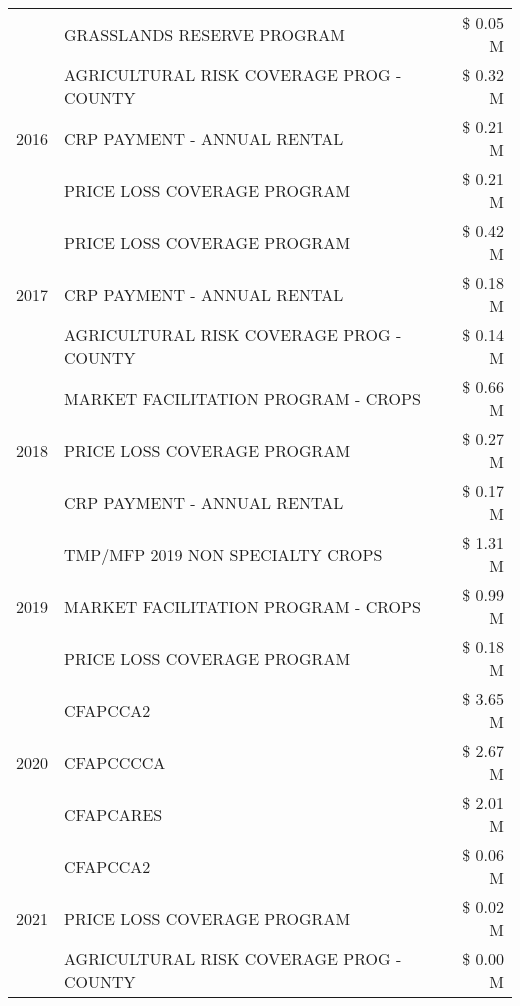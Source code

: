 \begin{tabular}{llr}
 & GRASSLANDS RESERVE PROGRAM & \$ 0.05 M \\
\cline{1-3}
\multirow[t]{3}{*}{2016} & AGRICULTURAL RISK COVERAGE PROG - COUNTY & \$ 0.32 M \\
 & CRP PAYMENT - ANNUAL RENTAL & \$ 0.21 M \\
 & PRICE LOSS COVERAGE PROGRAM & \$ 0.21 M \\
\cline{1-3}
\multirow[t]{3}{*}{2017} & PRICE LOSS COVERAGE PROGRAM & \$ 0.42 M \\
 & CRP PAYMENT - ANNUAL RENTAL & \$ 0.18 M \\
 & AGRICULTURAL RISK COVERAGE PROG - COUNTY & \$ 0.14 M \\
\cline{1-3}
\multirow[t]{3}{*}{2018} & MARKET FACILITATION PROGRAM - CROPS & \$ 0.66 M \\
 & PRICE LOSS COVERAGE PROGRAM & \$ 0.27 M \\
 & CRP PAYMENT - ANNUAL RENTAL & \$ 0.17 M \\
\cline{1-3}
\multirow[t]{3}{*}{2019} & TMP/MFP 2019 NON SPECIALTY CROPS & \$ 1.31 M \\
 & MARKET FACILITATION PROGRAM - CROPS & \$ 0.99 M \\
 & PRICE LOSS COVERAGE PROGRAM & \$ 0.18 M \\
\cline{1-3}
\multirow[t]{3}{*}{2020} & CFAPCCA2 & \$ 3.65 M \\
 & CFAPCCCCA & \$ 2.67 M \\
 & CFAPCARES & \$ 2.01 M \\
\cline{1-3}
\multirow[t]{3}{*}{2021} & CFAPCCA2 & \$ 0.06 M \\
 & PRICE LOSS COVERAGE PROGRAM & \$ 0.02 M \\
 & AGRICULTURAL RISK COVERAGE PROG - COUNTY & \$ 0.00 M \\
\cline{1-3}
\bottomrule
\end{tabular}
